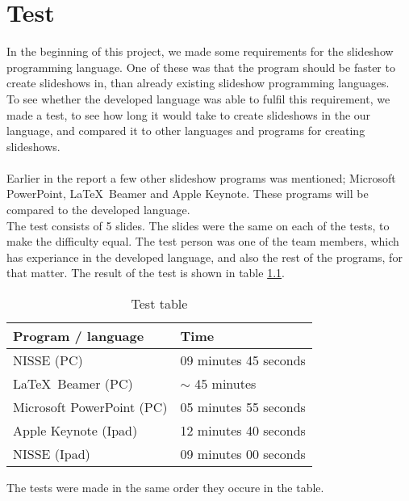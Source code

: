 \chapter{Test}
In the beginning of this project, we made some requirements for the slideshow programming language. One of these was that the program should be faster to create slideshows in, than already existing slideshow programming languages. \\
To see whether the developed language was able to fulfil this requirement, we made a test, to see how long it would take to create slideshows in the our language, and compared it to other languages and programs for creating slideshows.
\\ \\
Earlier in the report a few other slideshow programs was mentioned; Microsoft PowerPoint, \LaTeX~Beamer and Apple Keynote. These programs will be compared to the developed language.\\
The test consists of 5 slides. The slides were the same on each of the tests, to make the difficulty equal. The test person was one of the team members, which has experiance in the developed language, and also the rest of the programs, for that matter.
The result of the test is shown in table \ref{tbl:TestTable}.
\begin{table}
\centering
   \begin{tabular}{ | l | l |}
    \hline
    Program / language & Time \\ \hline
    NISSE (PC) & 09 minutes 45 seconds \\ 
    \LaTeX~Beamer (PC) & $\sim$ 45 minutes \\
    Microsoft PowerPoint (PC) & 05 minutes 55 seconds \\ 
    Apple Keynote (Ipad) & 12 minutes 40 seconds \\ 
    NISSE (Ipad) & 09 minutes 00 seconds \\ \hline
    
    \end{tabular}
    \caption{Test table}
    \label{tbl:TestTable}
\end{table}
The tests were made in the same order they occure in the table.\\

